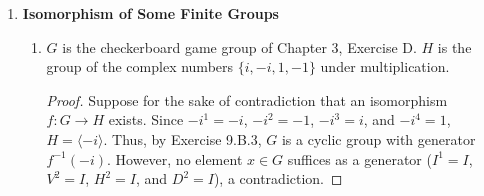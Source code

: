 \documentclass[../notes.tex]{subfiles}
\begin{document}
\begin{enumerate}[label={\textbf{\Alph*.}}]
    \item \textbf{Isomorphism of Some Finite Groups}
    \begin{enumerate}
        \item $G$ is the checkerboard game group of Chapter 3, Exercise D. $H$ is the group of the complex numbers $\{i,-i,1,-1\}$ under multiplication.
        \begin{proof}
            Suppose for the sake of contradiction that an isomorphism $f:G\to H$ exists. Since $-i^1=-i$, $-i^2=-1$, $-i^3=i$, and $-i^4=1$, $H=\langle -i\rangle$. Thus, by Exercise 9.B.3, $G$ is a cyclic group with generator $f^{-1}(-i)$. However, no element $x\in G$ suffices as a generator ($I^1=I$, $V^2=I$, $H^2=I$, and $D^2=I$), a contradiction.
        \end{proof}
    \end{enumerate}
\end{enumerate}



\setcounter{chapter}{12}
\end{document}

